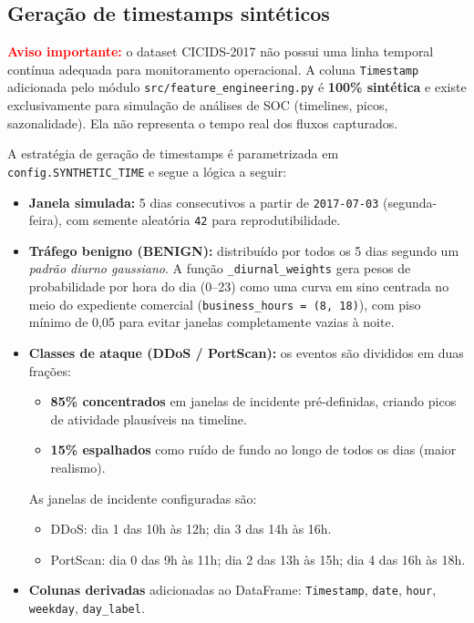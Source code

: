 \documentclass[12pt,a4paper]{article}
\begin{document}
\subsection{Geração de timestamps sintéticos}

\textbf{\textcolor{red}{Aviso importante:}} o dataset CICIDS-2017 não possui
uma linha temporal contínua adequada para monitoramento operacional. A coluna
\texttt{Timestamp} adicionada pelo módulo \texttt{src/feature\_engineering.py}
é \textbf{100\% sintética} e existe exclusivamente para simulação de análises
de SOC (timelines, picos, sazonalidade). Ela não representa o tempo real dos
fluxos capturados.

A estratégia de geração de timestamps é parametrizada em \texttt{config.SYNTHETIC\_TIME}
e segue a lógica a seguir:

\begin{itemize}
  \item \textbf{Janela simulada:} 5 dias consecutivos a partir de
        \texttt{2017-07-03} (segunda-feira), com semente aleatória \texttt{42}
        para reprodutibilidade.

  \item \textbf{Tráfego benigno (BENIGN):} distribuído por todos os 5 dias
        segundo um \emph{padrão diurno gaussiano}. A função
        \texttt{\_diurnal\_weights} gera pesos de probabilidade por hora do
        dia (0--23) como uma curva em sino centrada no meio do expediente
        comercial (\texttt{business\_hours = (8, 18)}), com piso mínimo de
        0{,}05 para evitar janelas completamente vazias à noite.

  \item \textbf{Classes de ataque (DDoS / PortScan):} os eventos são
        divididos em duas frações:
        \begin{itemize}
          \item \textbf{85\% concentrados} em janelas de incidente pré-definidas,
                criando picos de atividade plausíveis na timeline.
          \item \textbf{15\% espalhados} como ruído de fundo ao longo de todos
                os dias (maior realismo).
        \end{itemize}

        As janelas de incidente configuradas são:
        \begin{itemize}
          \item DDoS: dia 1 das 10h às 12h; dia 3 das 14h às 16h.
          \item PortScan: dia 0 das 9h às 11h; dia 2 das 13h às 15h;
                dia 4 das 16h às 18h.
        \end{itemize}

  \item \textbf{Colunas derivadas} adicionadas ao DataFrame:
        \texttt{Timestamp}, \texttt{date}, \texttt{hour}, \texttt{weekday},
        \texttt{day\_label}.
\end{itemize}
\end{document}
